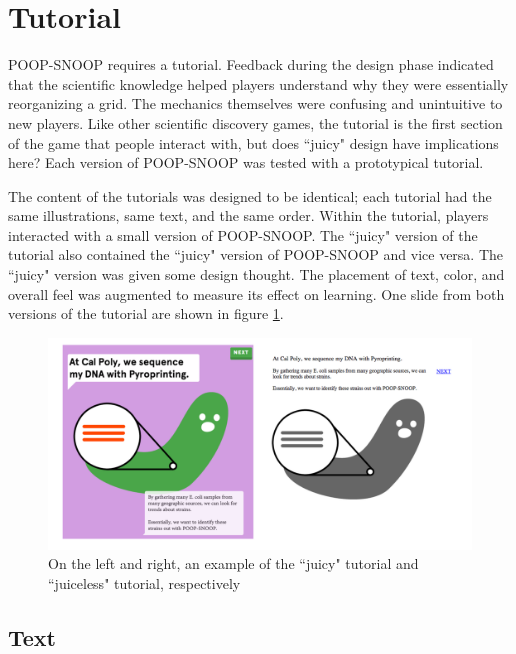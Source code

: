 \section{Tutorial}

POOP-SNOOP requires a tutorial. Feedback during the design phase indicated that the scientific knowledge helped players understand why they were essentially reorganizing a grid. The mechanics themselves were confusing and unintuitive to new players. Like other scientific discovery games, the tutorial is the first section of the game that people interact with, but does ``juicy" design have implications here? Each version of POOP-SNOOP was tested with a prototypical tutorial.

The content of the tutorials was designed to be identical; each tutorial had the same illustrations, same text, and the same order. Within the tutorial, players interacted with a small version of POOP-SNOOP. The ``juicy" version of the tutorial also contained the ``juicy" version of POOP-SNOOP and vice versa. The ``juicy" version was given some design thought. The placement of text, color, and overall feel was augmented to measure its effect on learning. One slide from both versions of the tutorial are shown in figure \ref{fig:tutorial}.

\begin{figure}
\begin{center}
\includegraphics[width=150mm]{images/tutorial.pdf}
\caption{On the left and right, an example of the ``juicy" tutorial and ``juiceless" tutorial, respectively}
\label{fig:tutorial}
\end{center}
\end{figure}

\subsection{Text}

